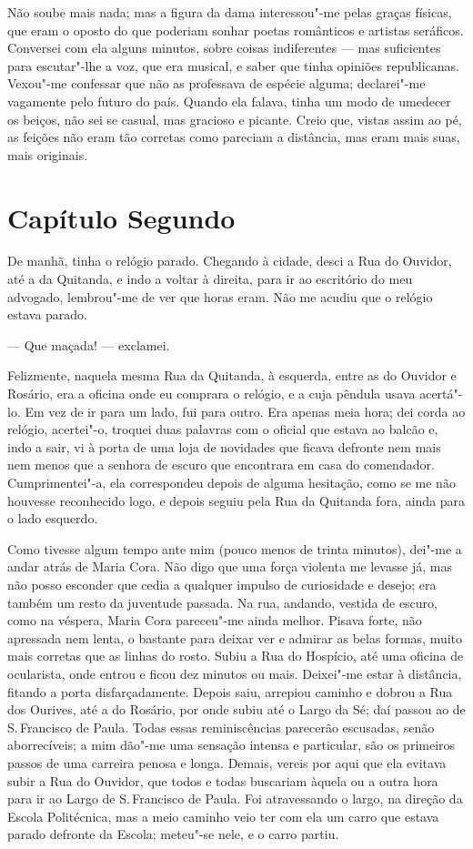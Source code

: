\begin{linenumbers}
Não soube mais nada; mas a figura da dama interessou"-me pelas graças
físicas, que eram o oposto do que poderiam sonhar poetas românticos e
artistas seráficos. Conversei com ela alguns minutos, sobre coisas
indiferentes --- mas suficientes para escutar"-lhe a voz, que era musical,
e saber que tinha opiniões republicanas. Vexou"-me confessar que não as
professava de espécie alguma; declarei"-me vagamente pelo futuro do país.
Quando ela falava, tinha um modo de umedecer os beiços, não sei se
casual, mas gracioso e picante. Creio que, vistas assim ao pé, as
feições não eram tão corretas como pareciam a distância, mas eram mais
suas, mais originais.

\section{Capítulo Segundo}

De manhã, tinha o relógio parado. Chegando à cidade, desci a Rua do
Ouvidor, até a da Quitanda, e indo a voltar à direita, para ir ao
escritório do meu advogado, lembrou"-me de ver que horas eram. Não me
acudiu que o relógio estava parado.

--- Que maçada! --- exclamei.

Felizmente, naquela mesma Rua da Quitanda, à esquerda, entre as do
Ouvidor e Rosário, era a oficina onde eu comprara o relógio, e a cuja
pêndula usava acertá"-lo. Em vez de ir para um lado, fui para outro. Era
apenas meia hora; dei corda ao relógio, acertei"-o, troquei duas palavras
com o oficial que estava ao balcão e, indo a sair, vi à porta de uma
loja de novidades que ficava defronte nem mais nem menos que a senhora
de escuro que encontrara em casa do comendador. Cumprimentei"-a, ela
correspondeu depois de alguma hesitação, como se me não houvesse
reconhecido logo, e depois seguiu pela Rua da Quitanda fora, ainda para
o lado esquerdo.

Como tivesse algum tempo ante mim (pouco menos de trinta minutos),
dei"-me a andar atrás de Maria Cora. Não digo que uma força violenta me
levasse já, mas não posso esconder que cedia a qualquer impulso de
curiosidade e desejo; era também um resto da juventude passada. Na rua,
andando, vestida de escuro, como na véspera, Maria Cora pareceu"-me ainda
melhor. Pisava forte, não apressada nem lenta, o bastante para deixar
ver e admirar as belas formas, muito mais corretas que as linhas do
rosto. Subiu a Rua do Hospício, até uma oficina de ocularista, onde
entrou e ficou dez minutos ou mais. Deixei"-me estar à distância, fitando
a porta disfarçadamente. Depois saiu, arrepiou caminho e dobrou a Rua
dos Ourives, até a do Rosário, por onde subiu até o Largo da Sé; daí
passou ao de S.\,Francisco de Paula. Todas essas reminiscências parecerão
escusadas, senão aborrecíveis; a mim dão"-me uma sensação intensa e
particular, são os primeiros passos de uma carreira penosa e longa.
Demais, vereis por aqui que ela evitava subir a Rua do Ouvidor, que
todos e todas buscariam àquela ou a outra hora para ir ao Largo de S.\,Francisco de Paula. Foi atravessando o largo, na direção da Escola
Politécnica, mas a meio caminho veio ter com ela um carro que estava
parado defronte da Escola; meteu"-se nele, e o carro partiu.


\end{linenumbers}
